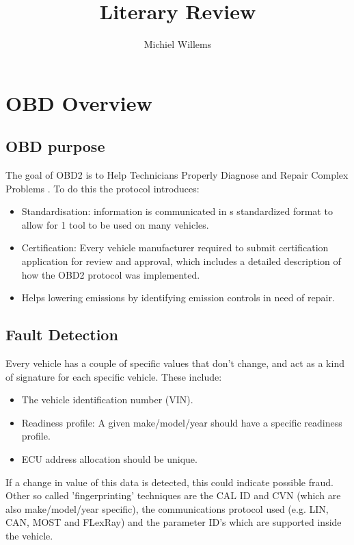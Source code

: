 \documentclass[11pt]{article}
\title{Literary Review}
\author{Michiel Willems}
\begin{document}
	

	
\maketitle

\section{OBD Overview}

\subsection{OBD purpose}

The goal of OBD2 is to Help Technicians Properly Diagnose and Repair Complex Problems \cite{OBDOverview}. To do this the protocol introduces:
\begin{itemize}
	\item Standardisation: information is communicated in s standardized format to allow for 1 tool to be used on many vehicles.
	\item Certification: Every vehicle manufacturer required to submit certification application for review and approval, which includes a detailed description of how the OBD2 protocol was implemented.
	\item Helps lowering emissions by identifying emission controls in need of repair.
\end{itemize}

\subsection{Fault Detection}
Every vehicle has a couple of specific values that don't change, and act as a kind of signature for each specific vehicle.
These include\cite{OBDOverview}:
\begin{itemize}
	\item The vehicle identification number (VIN).
	\item Readiness profile: A given make/model/year should have a specific readiness profile.
	\item ECU address allocation should be unique.
\end{itemize}
If a change in value of this data is detected, this could indicate possible fraud. Other so called 'fingerprinting' techniques are the CAL ID and CVN (which are also make/model/year specific), the communications protocol used (e.g. LIN, CAN, MOST and FLexRay) and the parameter ID's which are supported inside the vehicle. 
\end{document}
